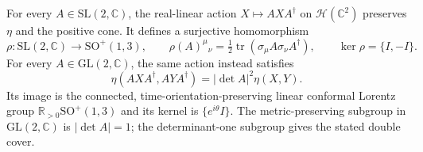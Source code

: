\begin{theorem}
\label{thm:lor-hermitian-cover}
For every $A\in\mathrm{SL}(2,\mathbb C)$, the real-linear action $X\mapsto AXA^\dagger$ on $\mathcal H(\mathbb C^2)$ preserves $\eta$ and the positive cone. It defines a surjective homomorphism
\begin{equation}
\rho:\mathrm{SL}(2,\mathbb C)\longrightarrow\mathrm{SO}^{+}(1,3),\qquad
\rho(A)^\mu{}_{\nu}=\tfrac12\operatorname{tr}(\sigma_\mu A\sigma_\nu A^\dagger),
\qquad \ker\rho=\{I,-I\}.
\label{eq:lor-double-cover}
\end{equation}
For every $A\in\mathrm{GL}(2,\mathbb C)$, the same action instead satisfies
\begin{equation}
\eta(AXA^\dagger,AYA^\dagger)=|\det A|^2\eta(X,Y).
\label{eq:lor-gl-conformal}
\end{equation}
Its image is the connected, time-orientation-preserving linear conformal Lorentz group $\mathbb R_{>0}\mathrm{SO}^{+}(1,3)$ and its kernel is $\{e^{i\theta}I\}$. The metric-preserving subgroup in $\mathrm{GL}(2,\mathbb C)$ is $|\det A|=1$; the determinant-one subgroup gives the stated double cover.
\end{theorem}
